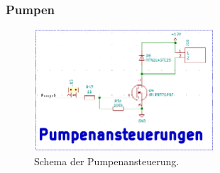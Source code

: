 \subsubsection{Pumpen}
\label{subsubsec:Pumpen}

\begin{figure}[h!]
	\centering
	\includegraphics[width=0.6\textwidth]{graphics/Schema_Pumpenansteuerung.png}
	\caption{Schema der Pumpenansteuerung.}
	\label{fig:Schema_Pumpenansteuerung}
\end{figure}
